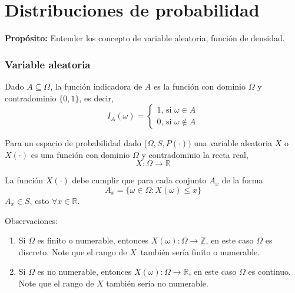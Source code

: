\chapter{Distribuciones de probabilidad}

\textbf{Propósito:} Entender los concepto de variable aleatoria, función de densidad.


\subsection{Variable aleatoria}

\begin{definition}
Dado $A\subseteq \Omega$, la función indicadora de $A$ es la función con dominio $\Omega $ y contradominio $\{0,1\}$, es decir, 
\begin{equation*}
I_{A}(\omega )=\left\{ 
\begin{array}{c}
1\text{, si }\omega \in A \\ 
0\text{, si }\omega \notin A
\end{array}
\right.
\end{equation*}
\end{definition}

\begin{definition}
Para un espacio de probabilidad dado ($\Omega,S,P(\cdot ))$ una variable aleatoria $X$ o $X(\cdot)$ es una función con dominio $\Omega $ y contradominio la recta real, 
\begin{equation*}
X:\Omega \rightarrow  \mathbb{R}
\end{equation*}
\end{definition}

La función $X(\cdot)$ debe cumplir que para cada conjunto $A_{x}$ de la forma 
\begin{equation*}
A_{x}=\{\omega \in \Omega :X(\omega )\leq x\}
\end{equation*}
$A_{x}\in S$, esto  $\forall x\in \mathbb{R}$.

Observaciones:
\begin{enumerate}
\item Si $\Omega $ es finito o numerable, entonces $X(\omega ):\Omega \rightarrow \mathbb{Z}$, en este caso $\Omega $ es discreto. Note que el rango de $X$\ también sería finito o numerable.

\item Si $\Omega $ es no numerable, entonces $X(\omega ):\Omega \rightarrow \mathbb{R}$, en este caso $\Omega $ es continuo. Note que el rango de $X$ también sería  no numerable.
\end{enumerate}

